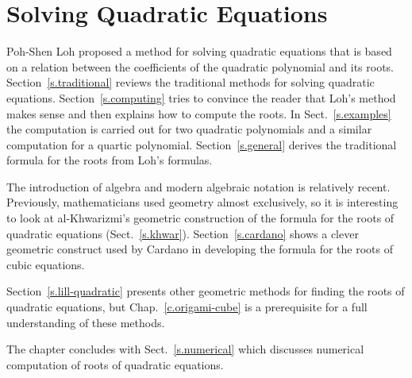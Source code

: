 
\chapter{Solving Quadratic Equations}\label{c.quadratic}




Poh-Shen Loh proposed a method for solving quadratic equations that is based on a relation between the coefficients of the quadratic polynomial and its roots. Section~\ref{s.traditional} reviews the traditional methods for solving quadratic equations. 
Section~\ref{s.computing} tries to convince the reader that Loh's method makes sense and then explains how to compute the roots. In Sect.~\ref{s.examples} the computation is carried out for two quadratic polynomials and a similar computation for a quartic polynomial. Section~\ref{s.general} derives the traditional formula for the roots from Loh's formulas.

The introduction of algebra and modern algebraic notation is relatively recent. Previously, mathematicians used geometry almost exclusively, so it is interesting to look at al-Khwarizmi's geometric construction of the formula for the roots of quadratic equations (Sect.~\ref{s.khwar}). Section~\ref{s.cardano} shows a clever geometric construct used by Cardano in developing the formula for the roots of cubic equations.

Section~\ref{s.lill-quadratic} presents other geometric methods for finding the roots of quadratic equations, but Chap.~\ref{c.origami-cube} is a prerequisite for a full understanding of these methods.

The chapter concludes with Sect.~\ref{s.numerical} which discusses numerical computation of roots of quadratic equations.

